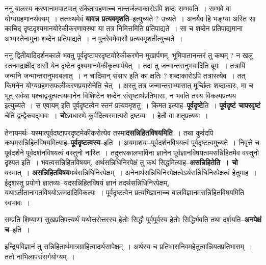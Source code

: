 \documentclass[article,12pt,a4paper]{memoir}
\begin{document}
	  \pstart ननु बालस्य करणानामपाटवात् संकेताग्रहणाच्च नान्तर्जल्पाकारोऽपि शब्दः सम्भवति । सम्भवे वा योग्यग्रहणानर्थक्यम् । तत्कथमेवं \textbf{यावन्न प्रत्यवमृशति}--इत्युच्यते ? उच्यते । अनयैव हि भङ्ग्या अस्ति सा काचिद् दृष्टदृश्यमानयोरेकीकरणावस्था या तत्र निमित्तमिति प्रतिपाद्यते । सा च शब्देन प्रतिपाद्यमाना अभ्यस्तेनामुना शब्देन प्रतिपाद्यते । न पुनरेवमेवासौ प्रत्यवमृशतीत्युच्यते ।
	\pend
      

	  \pstart ननु द्वितीयादिदर्शनकाले भवतु पूर्वदृष्टापरदृष्टयोरेकीकरणेन मुखार्पणम्, भूमिपातानन्तरं तु कथम् ? न खलु स्तनमद्राक्षीद् असौ येन दृष्टेन दृश्यमानमेकीकृत्यार्पयेत् । तदा तु जन्मान्तरानुभवादिति ब्रूमः । तत्रापि जन्मनि जन्मान्तरानुभवबलात् । न चादिमान् संसार इति का क्षतिः ? शब्दाकारोऽपि तत्रास्त्येव । तत् किमनेन योग्यग्रहणसफलीकरणप्रयासेनेति चेत् । अस्तु तत्र जन्मान्तराभ्यासात् मूर्च्छितः शब्दाकारः, मा च भूत् सर्वथा पश्चाद्व्युत्पत्स्यमानेन विशिष्टेन शब्देन संसृष्टार्थप्रतिभासः, न भवति तस्य विकल्पप्रत्यय इत्युच्यते । स एवायम् इति पूर्वदृष्टत्वेन स्तनं प्रत्यवमृशतु । किमत इत्याह--\textbf{पूर्वदृष्टे}ति । \textbf{पूर्वदृष्टं चापरदृष्टं} चेति द्वन्द्वैकवद्भावः । \textbf{चो}ऽवधारणे कुर्वदित्यस्मात्परो द्रष्टव्यः । हेतौ वा शतृप्रत्ययः ।
	\pend
      

	  \pstart तेनायमर्थः--यस्मात्पूर्वदष्टापरदृष्टमेकीकरोत्येव तस्मा\textbf{दसन्निहितविषयमिति} । तथा कुर्वदपि कथमसन्निहितविषयमित्याह--\textbf{पूर्वदृष्टत्वस्य}--इति । अयमाशयः--पूर्वदर्शनविषयत्वं पूर्वदृष्टत्वमुच्यते । निवृत्ते च पूर्वदर्शने पूर्वदर्शनविषयत्वं वस्तुनो नास्ति । तदुत्तरकालभाविना ज्ञानेन पूर्वज्ञानविष\leavevmode{}यत्वमसन्निहितमेव वस्तुनो दृश्यत इति । भवत्वसन्निहितविषयम्, अर्थसन्निधिनिरपेक्षं तु कथं सिद्धमित्याह--\textbf{असन्निहितेति । चो} यस्मात् । \textbf{असन्निहितविषय}मर्थसन्निधिनिरपेक्षम् । अनेनार्थसन्निधिनिरपेक्षत्वेऽर्थसन्निधिनिरपेक्षत्वं हेतुमाह । ईदृशस्तु प्रयोगो ज्ञातव्यः--यदसन्निहितविषयं ज्ञानं तदर्थसन्निधिनिरपेक्षम्, यथाऽतीतानागतविषयोऽस्मदादिविकल्पः । पूर्वदृष्टत्वेन प्रत्यभिज्ञानाच्च बालविज्ञानमसन्निहितविषयमिति स्वभावः ।
	\pend
      

	  \pstart सम्प्रति शिष्याणां सुखप्रतिपत्त्यर्थं यथोत्तरोत्तरस्य हेतोः सिद्धौ पूर्वपूर्वस्य हेतोः सिद्धिर्भवति तथा दर्शयति--\textbf{अनपेक्षं च}--इति ।
	\pend
	  \bigskip
	  \begingroup
	

	  \pstart इन्द्रियविज्ञानं तु सन्निहितार्थमात्रग्राहित्वादर्थसापेक्षम् । अर्थस्य च प्रतिभासनिवमहेतुत्वान्नियतप्रतिभासम् । ततो नाभिलापसंसर्गयोग्यम् ।
	\pend
        
\end{document}
